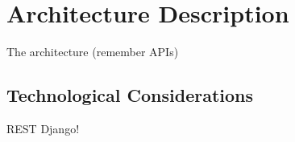 \chapter{Architecture Description}

	The architecture (remember APIs)

	\section{Technological Considerations}
		REST Django!
